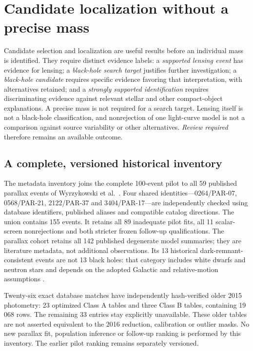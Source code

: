 \section{Candidate localization without a precise mass}
\label{sec:candidate-inventory}

Candidate selection and localization are useful results before an individual
mass is identified. They require distinct evidence labels: a \emph{supported
lensing event} has evidence for lensing; a \emph{black-hole search target}
justifies further investigation; a \emph{black-hole candidate} requires
specific evidence favoring that interpretation, with alternatives retained;
and a \emph{strongly supported identification} requires discriminating
evidence against relevant stellar and other compact-object explanations.
A precise mass is not required for a search target. Lensing itself is not
a black-hole classification, and nonrejection of one light-curve model is
not a comparison against source variability or other alternatives.
\emph{Review required} therefore remains an available outcome.

\subsection{A complete, versioned historical inventory}

The metadata inventory joins the complete 100-event pilot to all 59
published parallax events of Wyrzykowski et al.\ \cite{Wyrzykowski2015,Wyrzykowski2016}.
Four shared identities---0264/PAR-07, 0568/PAR-21, 2122/PAR-37 and
3404/PAR-17---are independently checked using database identifiers,
published aliases and compatible catalog directions. The union contains
155 events. It retains all 89 inadequate pilot fits, all 11 scalar-screen
nonrejections and both stricter frozen follow-up qualifications.
The parallax cohort retains all 142 published degenerate model summaries;
they are literature metadata, not additional observations.
Its 13 historical dark-remnant-consistent events are not 13 black holes:
that category includes white dwarfs and neutron stars and depends on the
adopted Galactic and relative-motion assumptions \cite{Wyrzykowski2016}.

Twenty-six exact database matches have independently hash-verified older
2015 photometry: 23 optimized Class A tables and three Class B tables,
containing 19\,068 rows. The remaining 33 entries stay explicitly
unavailable. These older tables are not asserted equivalent to the
2016 reduction, calibration or outlier masks. No new parallax fit,
population inference or follow-up ranking is performed by this inventory.
The earlier pilot ranking remains separately versioned.

